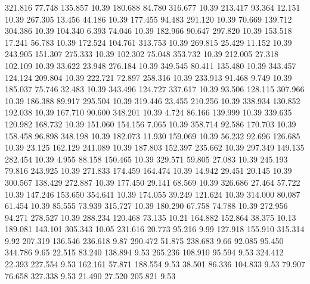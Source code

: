  321.816   77.748  135.857        10.39
 180.688   84.780  316.677        10.39
 213.417   93.364   12.151        10.39
 267.305   13.456   44.186        10.39
 177.455   94.483  291.120        10.39
  70.669  139.712  304.386        10.39
 104.340    6.393   74.046        10.39
 182.966   90.647  297.820        10.39
 153.518   17.241   56.783        10.39
 172.524  104.761  313.753        10.39
 269.815   25.429   11.152        10.39
 243.905  151.307  275.333        10.39
 102.302   75.048  353.732        10.39
 212.005   27.318  102.109        10.39
  33.622   23.948  276.184        10.39
 349.545   80.411  135.480        10.39
 343.457  124.124  209.804        10.39
 222.721   72.897  258.316        10.39
 233.913   91.468    9.749        10.39
 185.037   75.746   32.483        10.39
 343.496  124.727  337.617        10.39
  93.506  128.115  307.966        10.39
 186.388   89.917  295.504        10.39
 319.446   23.455  210.256        10.39
 338.934  130.852  192.038        10.39
 167.710   90.600  348.201        10.39
   4.724   86.166  139.999        10.39
 339.635  120.982  168.732        10.39
 151.060  154.156    7.065        10.39
 358.714   92.586  170.703        10.39
 158.458   96.898  348.198        10.39
 182.073   11.930  159.069        10.39
  56.232   92.696  126.685        10.39
  23.125  162.129  241.089        10.39
 187.803  152.397  235.662        10.39
 297.349  149.135  282.454        10.39
   4.955   88.158  150.465        10.39
 329.571   59.805   27.083        10.39
 245.193   79.816  243.925        10.39
 271.833  174.459  164.474        10.39
  14.942   29.451   20.145        10.39
 300.567  138.429  272.887        10.39
 177.450   29.141   68.569        10.39
 326.686   27.464   57.722        10.39
 147.246  153.650  354.641        10.39
 174.055   39.249  121.624        10.39
 314.000   80.087   61.454        10.39
  85.555   73.939  315.727        10.39
 180.290   67.758   74.788        10.39
 272.956   94.271  278.527        10.39
 288.234  120.468   73.135        10.21
 164.882  152.864   38.375        10.13
 189.081  143.101  305.343        10.05
 231.616   20.773   95.216         9.99
 127.918  155.910  315.314         9.92
 207.319  136.546  236.618         9.87
 290.472   51.875  238.683         9.66
  92.085   95.450  344.786         9.65
  22.515   83.240  138.894         9.53
 265.236  108.910   95.594         9.53
 324.412   22.393  227.554         9.53
 162.161   57.871  188.554         9.53
  38.501   86.336  104.833         9.53
  79.907   76.658  327.338         9.53
  21.490   27.520  205.821         9.53
